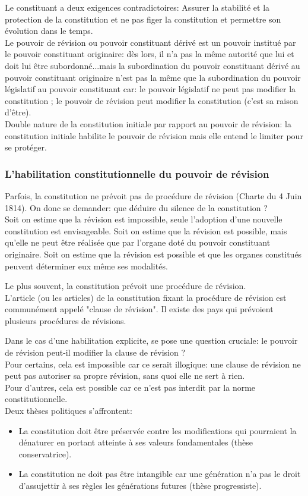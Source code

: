 \documentclass[12pt, a4paper, openany]{book}
\begin{document}
Le constituant a deux exigences contradictoires: Assurer la stabilité et la protection de la constitution et ne pas figer la constitution et permettre son évolution dans le temps. \\
Le pouvoir de révision ou pouvoir constituant dérivé est un pouvoir institué par le pouvoir constituant originaire: dès lors, il n'a pas la même autorité que lui et doit lui être subordonné...mais la subordination du pouvoir constituant dérivé au pouvoir constituant originaire n'est pas la même que la subordination du pouvoir législatif au pouvoir constituant car: le pouvoir législatif ne peut pas modifier la constitution ; le pouvoir de révision peut modifier la constitution (c'est sa raison d'être). \\
Double nature de la constitution initiale par rapport au pouvoir de révision: la constitution initiale habilite le pouvoir de révision mais elle entend le limiter pour se protéger.

\subsubsection{L'habilitation constitutionnelle du pouvoir de révision}

Parfois, la constitution ne prévoit pas de procédure de révision (Charte du 4 Juin 1814). On donc se demander: que déduire du silence de la constitution ? \\
Soit on estime que la révision est impossible, seule l'adoption d'une nouvelle constitution est envisageable. Soit on estime que la révision est possible, mais qu'elle ne peut être réalisée que par l'organe doté du pouvoir constituant originaire. Soit on estime que la révision est possible et que les organes constitués peuvent déterminer eux même ses modalités.


Le plus souvent, la constitution prévoit une procédure de révision. \\
L'article (ou les articles) de la constitution fixant la procédure de révision est communément appelé "clause de révision". Il existe des pays qui prévoient plusieurs procédures de révisions.


Dans le cas d'une habilitation explicite, se pose une question cruciale: le pouvoir de révision peut-il modifier la clause de révision ? \\
Pour certains, cela est impossible car ce serait illogique: une clause de révision ne peut pas autoriser sa propre révision, sans quoi elle ne sert à rien.  \\
Pour d'autres, cela est possible car ce n'est pas interdit par la norme constitutionnelle. \\
Deux thèses politiques s'affrontent:
\begin{itemize}
\item La constitution doit être préservée contre les modifications qui pourraient la dénaturer en portant atteinte à ses valeurs fondamentales (thèse conservatrice).
\item La constitution ne doit pas être intangible car une génération n'a pas le droit d'assujettir à ses règles les générations futures (thèse progressiste).
\end{itemize}
\end{document}

